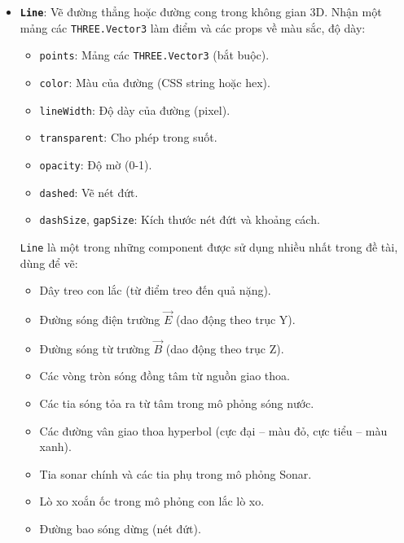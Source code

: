 \begin{itemize}
    \item \textbf{\texttt{Line}}: Vẽ đường thẳng hoặc đường cong trong không gian 3D. Nhận một mảng các \texttt{THREE.Vector3} làm điểm và các props về màu sắc, độ dày:
    \begin{itemize}
        \item \texttt{points}: Mảng các \texttt{THREE.Vector3} (bắt buộc).
        \item \texttt{color}: Màu của đường (CSS string hoặc hex).
        \item \texttt{lineWidth}: Độ dày của đường (pixel).
        \item \texttt{transparent}: Cho phép trong suốt.
        \item \texttt{opacity}: Độ mờ (0-1).
        \item \texttt{dashed}: Vẽ nét đứt.
        \item \texttt{dashSize}, \texttt{gapSize}: Kích thước nét đứt và khoảng cách.
    \end{itemize}
    \texttt{Line} là một trong những component được sử dụng nhiều nhất trong đề tài, dùng để vẽ:
    \begin{itemize}
        \item Dây treo con lắc (từ điểm treo đến quả nặng).
        \item Đường sóng điện trường $\vec{E}$ (dao động theo trục Y).
        \item Đường sóng từ trường $\vec{B}$ (dao động theo trục Z).
        \item Các vòng tròn sóng đồng tâm từ nguồn giao thoa.
        \item Các tia sóng tỏa ra từ tâm trong mô phỏng sóng nước.
        \item Các đường vân giao thoa hyperbol (cực đại – màu đỏ, cực tiểu – màu xanh).
        \item Tia sonar chính và các tia phụ trong mô phỏng Sonar.
        \item Lò xo xoắn ốc trong mô phỏng con lắc lò xo.
        \item Đường bao sóng dừng (nét đứt).
    \end{itemize}
    

\end{itemize}
